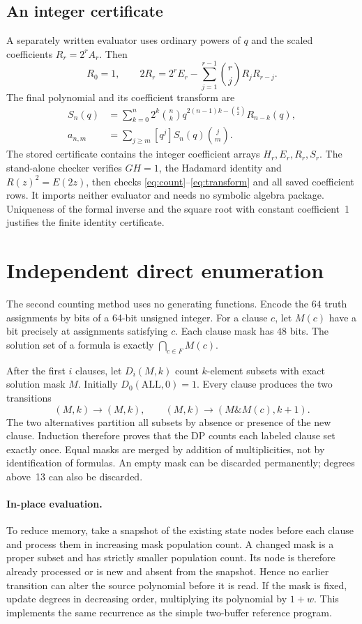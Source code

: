\documentclass[11pt,a4paper]{article}
\newcommand{\coeff}[1]{\left[#1\right]}
\begin{document}
\subsection{An integer certificate}
A separately written evaluator uses ordinary powers of $q$ and the scaled
coefficients $R_r=2^r A_r$. Then
\begin{equation}\label{eq:scaled}
R_0=1,\qquad
2R_r=2^r E_r-\sum_{j=1}^{r-1}\binom rj R_jR_{r-j}.
\end{equation}
The final polynomial and its coefficient transform are
\begin{align}
S_n(q)&=\sum_{k=0}^n2^k\binom nk
q^{2(n-1)k-\binom k2}R_{n-k}(q),\\
a_{n,m}&=\sum_{j\ge m}\coeff{q^j}S_n(q)\binom jm.\label{eq:transform}
\end{align}
The stored certificate contains the integer coefficient arrays $H_r,E_r,R_r,S_r$.
The stand-alone checker verifies $GH=1$, the Hadamard identity and
$R(z)^2=E(2z)$, then checks \eqref{eq:count}--\eqref{eq:transform} and all saved
coefficient rows. It imports neither evaluator and needs no symbolic algebra
package. Uniqueness of the formal inverse and the square root with constant
coefficient~1 justifies the finite identity certificate.

\section{Independent direct enumeration}
The second counting method uses no generating functions. Encode the $64$ truth
assignments by bits of a 64-bit unsigned integer. For a clause $c$, let $M(c)$
have a bit precisely at assignments satisfying $c$. Each clause mask has $48$
bits. The solution set of a formula is exactly $\bigcap_{c\in F}M(c)$.

After the first $i$ clauses, let $D_i(M,k)$ count $k$-element subsets with exact
solution mask $M$. Initially $D_0(\mathrm{ALL},0)=1$. Every clause produces the
two transitions
\[
(M,k)\longrightarrow(M,k),\qquad
(M,k)\longrightarrow(M\mathbin{\&}M(c),k+1).
\]
The two alternatives partition all subsets by absence or presence of the new
clause. Induction therefore proves that the DP counts each labeled clause set
exactly once. Equal masks are merged by addition of multiplicities, not by
identification of formulas. An empty mask can be discarded permanently;
degrees above~13 can also be discarded.

\paragraph{In-place evaluation.}
To reduce memory, take a snapshot of the existing state nodes before each clause
and process them in increasing mask population count. A changed mask is a proper
subset and has strictly smaller population count. Its node is therefore already
processed or is new and absent from the snapshot. Hence no earlier transition
can alter the source polynomial before it is read. If the mask is fixed, update
degrees in decreasing order, multiplying its polynomial by $1+w$. This implements
the same recurrence as the simple two-buffer reference program.
\end{document}
